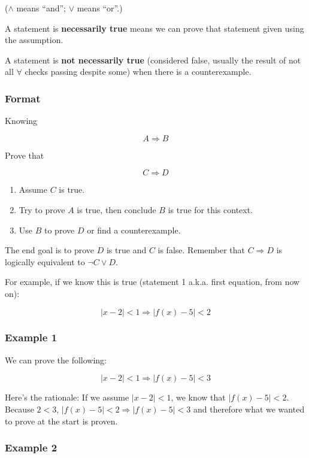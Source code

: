 \documentclass[12pt]{article}
\theoremstyle{plain}
\theoremstyle{remark}
\theoremstyle{definition}
\begin{document}
(\(\land\) means ``and''; \(\vee\) means ``or''.)

A statement is \textbf{necessarily true} means we can prove that
statement given using the assumption.

A statement is \textbf{not necessarily true} (considered false, usually
the result of not all \(\forall\) checks passing despite some) when
there is a counterexample.


\subsubsection{Format}

Knowing

\[A \Rightarrow B\]

Prove that

\[C \Rightarrow D\]

\begin{enumerate}
\def\labelenumi{\arabic{enumi}.}
\item
  Assume \(C\) is true.
\item
  Try to prove \(A\) is true, then conclude \(B\) is true for this
  context.
\item
  Use \(B\) to prove \(D\) or find a counterexample.
\end{enumerate}

The end goal is to prove \(D\) is true and \(C\) is false. Remember that
\(C \Rightarrow D\) is logically equivalent to \(\neg C \vee D\).

For example, if we know this is true (statement 1 a.k.a. first equation,
from now on):

\[|x - 2| < 1 \Rightarrow \left| f(x) - 5 \right| < 2\]


\subsubsection{Example 1}

We can prove the following:

\[|x - 2| < 1 \Rightarrow \left| f(x) - 5 \right| < 3\]

Here's the rationale: If we assume \(|x - 2| < 1\), we know that
\(\left| f(x) - 5 \right| < 2\). Because \(2 < 3\),
\(\left| f(x) - 5 \right| < 2 \Rightarrow \left| f(x) - 5 \right| < 3\)
and therefore what we wanted to prove at the start is proven.


\subsubsection{Example 2}
\end{document}
